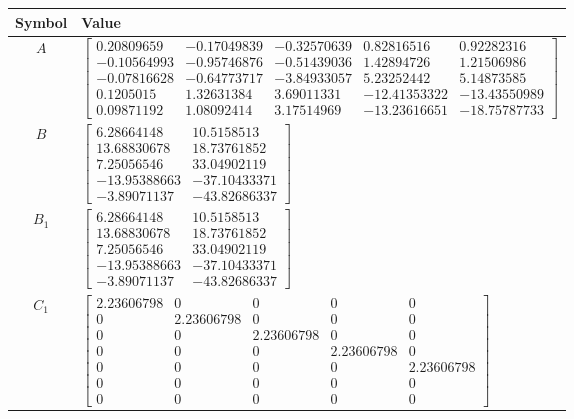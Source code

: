 \begin{tabular}{cl}
\hline
  Symbol  & Value                                                                                                                                                                                                                                                                                                                                                                                  \\
\hline
   $A$    & $\left[\begin{matrix}0.20809659 & -0.17049839 & -0.32570639 & 0.82816516 & 0.92282316\\-0.10564993 & -0.95746876 & -0.51439036 & 1.42894726 & 1.21506986\\-0.07816628 & -0.64773717 & -3.84933057 & 5.23252442 & 5.14873585\\0.1205015 & 1.32631384 & 3.69011331 & -12.41353322 & -13.43550989\\0.09871192 & 1.08092414 & 3.17514969 & -13.23616651 & -18.75787733\end{matrix}\right]$ \\
   $B$    & $\left[\begin{matrix}6.28664148 & 10.5158513\\13.68830678 & 18.73761852\\7.25056546 & 33.04902119\\-13.95388663 & -37.10433371\\-3.89071137 & -43.82686337\end{matrix}\right]$                                                                                                                                                                                                         \\
 $B_{1}$  & $\left[\begin{matrix}6.28664148 & 10.5158513\\13.68830678 & 18.73761852\\7.25056546 & 33.04902119\\-13.95388663 & -37.10433371\\-3.89071137 & -43.82686337\end{matrix}\right]$                                                                                                                                                                                                         \\
 $C_{1}$  & $\left[\begin{matrix}2.23606798 & 0 & 0 & 0 & 0\\0 & 2.23606798 & 0 & 0 & 0\\0 & 0 & 2.23606798 & 0 & 0\\0 & 0 & 0 & 2.23606798 & 0\\0 & 0 & 0 & 0 & 2.23606798\\0 & 0 & 0 & 0 & 0\\0 & 0 & 0 & 0 & 0\end{matrix}\right]$                                                                                                                                                              \\

\end{tabular}
